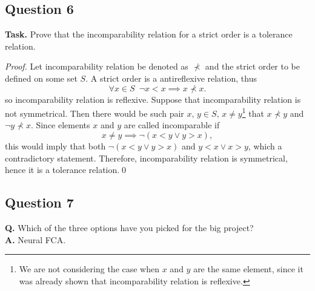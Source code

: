 \documentclass[14pt,a4paper]{extarticle}
\begin{document}
	\subsection*{Question 6}
	
	\noindent\textbf{Task.} Prove that the incomparability relation for a strict order is a tolerance relation.
	
	\begin{proof}
		 Let incomparability relation be denoted as $\nprec$ and the strict order to be defined on some set $S$. A strict order is a antireflexive relation, thus 
		 \[\forall x\in S \,\,\, \lnot x<x \implies x\nprec x.\]
		 so incomparability relation is reflexive. Suppose that incomparability relation is not symmetrical. Then there would be such pair $x,\, y\in S,\, x\neq y$\footnote{We are not considering the case when $x$ and $y$ are the same element, since it was already shown that incomparability relation is reflexive.} that $x\nprec y$ and $\lnot y\nprec x$. Since elements $x$ and $y$ are called incomparable if 
		 \[x\neq y \implies \lnot (x<y\lor y>x),\]
		 this would imply that both $\lnot (x<y\lor y>x)$ and $y<x\lor x>y$, which a contradictory statement. Therefore, incomparability relation is symmetrical, hence it is a tolerance relation.\qed 
	\end{proof}
	
	\subsection*{Question 7}
	
	\noindent\textbf{Q.} Which of the three options have you picked for the big project?\\
	\noindent\textbf{A.} Neural FCA.
\end{document}
